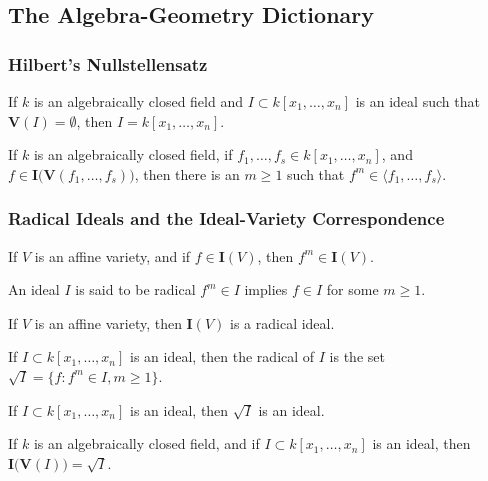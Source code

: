 \documentclass[../main.tex]{subfiles}
\begin{document}
\subsection{The Algebra-Geometry Dictionary}
%
\subsubsection{Hilbert's Nullstellensatz}
%
\begin{theorem}
If $k$ is an algebraically closed field and $I \subset k[x_1,\hdots ,x_n]$ is an ideal such that $\textbf{V}(I) = \emptyset$, then $I = k[x_1,\hdots ,x_n]$.
\end{theorem}
%
\begin{theorem}
If $k$ is an algebraically closed field, if $f_1,\hdots, f_s\in k[x_1,\hdots ,x_n]$, and $f\in \textbf{I}\big(\textbf{V}(f_1,\hdots, f_s)\big)$, then there is an $m\geq 1$ such that $f^m \in \langle f_1,\hdots, f_s \rangle$.
\end{theorem}
%
\subsubsection{Radical Ideals and the Ideal-Variety Correspondence}
%
\begin{theorem}
If $V$ is an affine variety, and if $f\in \textbf{I}(V)$, then $f^m\in \textbf{I}(V)$.
\end{theorem}

\begin{definition}
An ideal $I$ is said to be radical $f^m \in I$ implies $f\in I$ for some $m\geq 1$.
\end{definition}

\begin{theorem}
If $V$ is an affine variety, then $\textbf{I}(V)$ is a radical ideal.
\end{theorem}

\begin{definition}
If $I\subset k[x_1,\hdots ,x_n]$ is an ideal, then the radical of $I$ is the set $\sqrt{I} = \{f: f^m \in I, m \geq 1\}$.
\end{definition}

\begin{theorem}
If $I\subset k[x_1,\hdots ,x_n]$ is an ideal, then $\sqrt{I}$ is an ideal.
\end{theorem}

\begin{theorem}
If $k$ is an algebraically closed field, and if $I\subset k[x_1,\hdots ,x_n]$ is an ideal, then $\textbf{I}\big(\textbf{V}(I)\big) = \sqrt{I}$.
\end{theorem}
\end{document}

